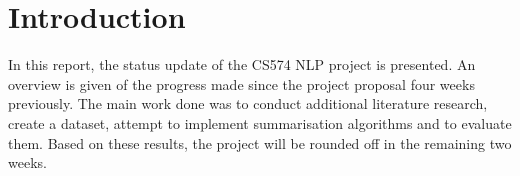 \section{Introduction}
In this report, the status update of the CS574 NLP project is presented. An overview is given of the progress made since the project proposal four weeks previously. The main work done was to conduct additional literature research, create a dataset, attempt to implement summarisation algorithms and to evaluate them. Based on these results, the project will be rounded off in the remaining two weeks.